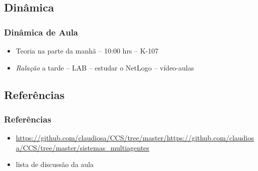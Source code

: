 \subsection{Dinâmica}
\begin{frame}

    \frametitle{Dinâmica de Aula}

    \begin{itemize}
      
      \item Teoria na parte da manhã -- 10:00 hrs -- K-107
      \item \textit{Ralação} a tarde -- LAB -- estudar o NetLogo -- vídeo-aulas
      
    \end{itemize}
\end{frame}




\subsection{Referências}
\begin{frame}
    \frametitle{Referências}
    \begin{itemize}
     \item \url{https://github.com/claudiosa/CCS/tree/master/https://github.com/claudiosa/CCS/tree/master/sistemas_multiagentes}
     \item lista de discussão da aula
    \end{itemize}
\end{frame}

